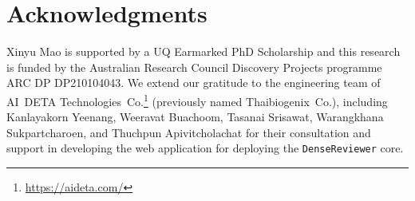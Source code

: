 \documentclass[runningheads]{llncs}
\begin{document}







\section*{Acknowledgments}
\label{ack}
Xinyu Mao is supported by a UQ Earmarked PhD Scholarship and this research is funded by the Australian Research Council Discovery Projects programme ARC DP DP210104043.
We extend our gratitude to the engineering team of AI~DETA Technologies~Co.\footnote{\url{https://aideta.com/}} (previously named Thaibiogenix~Co.), including Kanlayakorn Yeenang, Weeravat Buachoom, Tasanai Srisawat, Warangkhana Sukpartcharoen, and Thuchpun Apivitcholachat for their consultation and support in developing the web application for deploying  the \texttt{DenseReviewer} core.


\end{document}

